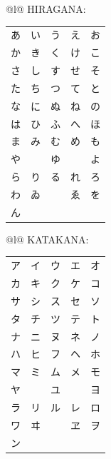 \documentclass[border=1.5cm]{standalone}
\begin{document}
\begin{tabular}[t]{@{}l@{}}
{\ascii\scriptsize HIRAGANA:}\\
{\jp
\begin{tabular}{@{}lllll@{}}
あ & い & う & え & お \\
か & き & く & け & こ \\
さ & し & す & せ & そ \\
た & ち & つ & て & と \\
な & に & ぬ & ね & の \\
は & ひ & ふ & へ & ほ \\
ま & み & む & め & も \\
や &   & ゆ &   & よ \\
ら & り & る & れ & ろ \\
わ & ゐ &   & ゑ & を \\
ん &   &   &   &
\end{tabular}}
\end{tabular}%
\hspace{1.5cm}%
\begin{tabular}[t]{@{}l@{}}
{\ascii\scriptsize KATAKANA:}\\
{\jp
\begin{tabular}{@{}lllll@{}}
ア & イ & ウ & エ & オ \\
カ & キ & ク & ケ & コ \\
サ & シ & ス & セ & ソ \\
タ & チ & ツ & テ & ト \\
ナ & ニ & ヌ & ネ & ノ \\
ハ & ヒ & フ & ヘ & ホ \\
マ & ミ & ム & メ & モ \\
ヤ &   & ユ &   & ヨ \\
ラ & リ & ル & レ & ロ \\
ワ & ヰ &   & ヱ & ヲ \\
ン &   &   &   &
\end{tabular}}
\end{tabular}
\end{document}
